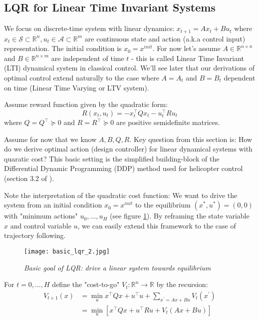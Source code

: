 \documentclass[a4paper]{article}
\begin{document}
\subsection{LQR for Linear Time Invariant Systems}

We focus on discrete-time system with linear dynamics: $x_{t+1} = Ax_t+Bu_t$ where $x_t\in\mathcal{S}\subset\mathbb{R}^n, u_t\in\mathcal{A}\subset\mathbb{R}^m$ are continuous state and action (a.k.a control input) representation. The initial condition is $x_0 = x^{init}$. For now let's assume $A\in\mathbb{R}^{n\times n}$ and $B\in\mathbb{R}^{n\times m}$ are independent of time $t$ - this is called Linear Time Invariant (LTI) dynamical system in classical control. We'll see later that our derivations of optimal control extend naturally to the case where $A=A_t$ and $B=B_t$ dependent on time (Linear Time Varying or LTV system). 

Assume reward function given by the quadratic form:
\begin{equation}
R(x_t,u_t) = -x_t^\intercal Qx_t - u_t^\intercal Ru_t
\end{equation}
where $Q=Q^\intercal\succeq 0$ and $R=R^\intercal\succeq 0$ are positive semidefinite matrices. 

Assume for now that we know $A,B,Q,R$. Key question from this section is: How do we derive optimal action (design controller) for linear dynamical systems with quaratic cost? This basic setting is the simplified building-block of the Differential Dynamic Programming (DDP) method used for helicopter control (section 3.2 of \cite{abbeel2007application}). %

Note the interpretation of the quadratic cost function: We want to drive the system from an initial condition $x_0 = x^{init}$ to the equilibrium $(x^*,u^*) = (0,0)$ with "minimum actions" $u_0,\ldots,u_H$ (see figure \ref{fig:basic_lqr}). By reframing the state variable $x$ and control variable $u$, we can easily extend this framework to the case of trajectory following.
\begin{figure}[h]
	\centering
	\texttt{[image: basic\_lqr\_2.jpg]}
	\caption{\textit{Basic goal of LQR: drive a linear system towards equilibrium}}
	\label{fig:basic_lqr}
\end{figure}

For $t=0,\ldots,H$ define the "cost-to-go"  $V_t:\mathbb{R}^n\rightarrow\mathbb{R}$ by the recursion:
\begin{align}
V_{t+1}(x) &= \min\limits_{u}x^\intercal Qx+u^\intercal u+\sum\limits_{x^\prime = Ax+Bu}V_t(x^\prime) \\
&= \min\limits_{u}\left[ x^\intercal Qx+u^\intercal Ru+V_t(Ax+Bu)\right]
\end{align}
\end{document}
